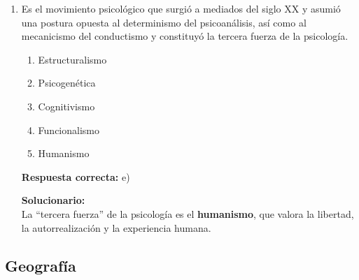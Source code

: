 \begin{enumerate}
	\vspace{2mm}
	\textbf{Solucionario:}\\
	La emoción se manifiesta con gran fuerza fisiológica; por ello corresponde a la \textbf{intensidad} del proceso afectivo.
	
	
	
	\vspace{6mm}
	
	\item Es el movimiento psicológico que surgió a mediados del siglo XX y asumió una postura opuesta al determinismo del psicoanálisis, así como al mecanicismo del conductismo y constituyó la tercera fuerza de la psicología.
	\begin{enumerate}[label=\alph*)]
		\item Estructuralismo
		\item Psicogenética
		\item Cognitivismo
		\item Funcionalismo
		\item Humanismo
	\end{enumerate}
	\textbf{Respuesta correcta:} e)
	
	\vspace{2mm}
	\textbf{Solucionario:}\\
	La ``tercera fuerza'' de la psicología es el \textbf{humanismo}, que valora la libertad, la autorrealización y la experiencia humana.
	

	
	\vspace{6mm}
\end{enumerate}

\subsection*{Geografía}

